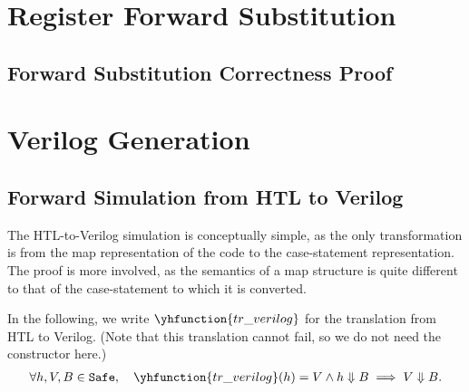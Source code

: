 \section{Register Forward Substitution}%
\label{sec:hg:register-forward-substitution}

\subsection{Forward Substitution Correctness Proof}%
\label{sec:hg:forward-substitution-correctness-proof}

\section{Verilog Generation}%
\label{sec:hg:verilog-generation}

\subsection{Forward Simulation from HTL to Verilog}%
\label{sec:proof:htl_verilog}

The HTL-to-Verilog simulation is conceptually simple, as the only transformation
is from the map representation of the code to the case-statement representation.
The proof is more involved, as the semantics of a map structure is quite
different to that of the case-statement to which it is converted.

\begin{lemma}\label{lemma:verilog}
  In the following, we write $\yhfunction{tr\_verilog}$ for the translation from
  HTL to Verilog. (Note that this translation cannot fail, so we do not need the
   constructor here.)
  \begin{align*}
    \forall h, V, B \in \texttt{Safe},\quad \yhfunction{tr\_verilog} (h) = V \land h \Downarrow B \implies V \Downarrow B.
  \end{align*}
\end{lemma}

